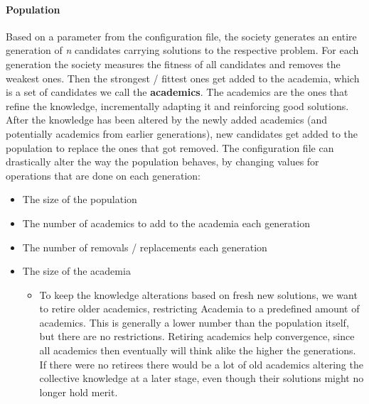 \documentclass[a4paper,english]{report}
\begin{document}
		\paragraph{Population}
		Based on a parameter from the configuration file, the society generates an entire generation of \textit{n} candidates carrying solutions to the respective problem. For each generation the society measures the fitness of all candidates and removes the weakest ones. Then the strongest / fittest ones get added to the academia, which is a set of candidates we call the \textbf{academics}. The academics are the ones that refine the knowledge, incrementally adapting it and reinforcing good solutions. After the knowledge has been altered by the newly added academics (and potentially academics from earlier generations), new candidates get added to the population to replace the ones that got removed. The configuration file can drastically alter the way the population behaves, by changing values for operations that are done on each generation:
		\begin{itemize}
			\item The size of the population
			\item The number of academics to add to the academia each generation
			\item The number of removals / replacements each generation
			\item The size of the academia
			   \begin{itemize}
				\item To keep the knowledge alterations based on fresh new solutions, we want to retire older academics, restricting Academia to a predefined amount of academics. This is generally a lower number than the population itself, but there are no restrictions. Retiring academics help convergence, since all academics then eventually will think alike the higher the generations. If there were no retirees there would be a lot of old academics altering the collective knowledge at a later stage, even though their solutions might no longer hold merit.
				\end{itemize}
		\end{itemize}
		\clearpage
\end{document}
